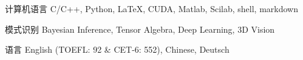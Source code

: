 


\begin{cvskills}


\cvskill
{计算机语言} %
{C/C++, Python, LaTeX, CUDA, Matlab, Scilab, shell, markdown} %


\cvskill
{模式识别} %
{Bayesian Inference, Tensor Algebra, Deep Learning, 3D Vision} %


\cvskill
{语言} %
{English (TOEFL: 92 \& CET-6: 552), Chinese, Deutsch} %


\end{cvskills}
